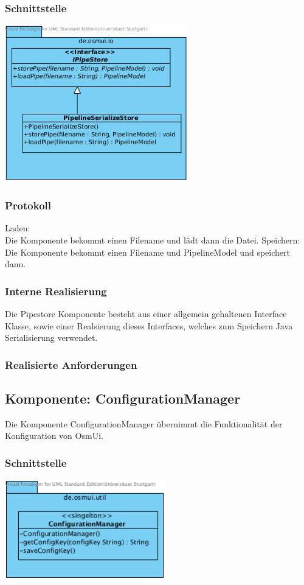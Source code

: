 \documentclass[a4paper,12pt]{scrartcl}
\begin{document}
\subsubsection{Schnittstelle}
\begin{center}
\includegraphics[width=8cm]{Schnittstelle_IPipeStore.png}
\end{center}
\subsubsection{Protokoll}
Laden: \\
Die Komponente bekommt einen Filename und lädt dann die Datei.
Speichern: \\
Die Komponente bekommt einen Filename und PipelineModel und speichert dann.
\subsubsection{Interne Realisierung}
Die Pipestore Komponente besteht aus einer allgemein gehaltenen Interface Klasse, sowie einer Realsierung dieses Interfaces, welches
zum Speichern Java Serialisierung verwendet.
\subsubsection{Realisierte Anforderungen}

\subsection{Komponente: ConfigurationManager}
Die Komponente ConfigurationManager übernimmt die Funktionalität der Konfiguration von OsmUi.
\subsubsection{Schnittstelle}
\begin{center}
\includegraphics[width=7cm]{Schnittstelle_ConfigurationManager.png}
\end{center}
\end{document}

